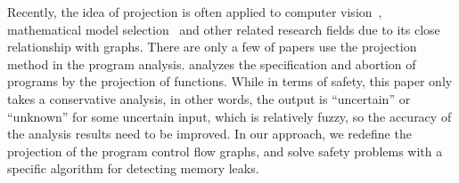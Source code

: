 Recently, the idea of projection is often applied to computer vision~\cite{DG14, HWS15}, mathematical model selection~\cite{NL10} and other related research fields due to its close relationship with graphs. There are only a few of papers use the projection method in the program analysis. \cite{D94} analyzes the specification and abortion of programs by the projection of functions. While in terms of safety, this paper only takes a conservative analysis, in other words, the output is ``uncertain” or ``unknown” for some uncertain input, which is relatively fuzzy, so the accuracy of the analysis results need to be improved. In our approach, we redefine the projection of the program control flow graphs, and solve safety problems with a specific algorithm for detecting memory leaks.
